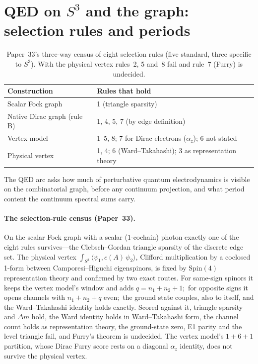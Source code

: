 \documentclass[aps,pra,twocolumn,superscriptaddress,longbibliography]{revtex4-2}
\begin{document}
\section{QED on $S^3$ and the graph: selection rules and periods}\label{sec:qed}

\begin{table}[t]
\centering
\begin{tabular}{ll}
\hline\hline
Construction & Rules that hold \\
\hline
Scalar Fock graph          & 1 (triangle sparsity) \\
Native Dirac graph (rule B) & 1, 4, 5, 7 (by edge definition) \\
Vertex model               & 1--5, 8; 7 for Dirac electrons ($\alpha_z$); 6 not stated \\
Physical vertex            & 1, 4; 6 (Ward--Takahashi); 3 as representation theory \\
\hline\hline
\end{tabular}
\caption{Paper~33's three-way census of eight selection rules (five
standard, three specific to $S^3$).  With the physical vertex rules~2,
5 and~8 fail and rule~7 (Furry) is undecided.}
\label{tab:partition}
\end{table}

The QED arc asks how much of perturbative quantum electrodynamics is
visible on the combinatorial graph, before any continuum projection, and
what period content the continuum spectral sums carry.

\paragraph{The selection-rule census (Paper~33).}
On the scalar Fock graph with a scalar ($1$-cochain) photon exactly one of
the eight rules survives---the Clebsch--Gordan triangle sparsity of the
discrete edge set.  The physical vertex
$\int_{S^3}\langle\psi_1, c(A)\,\psi_2\rangle$, Clifford multiplication
by a coclosed 1-form between Camporesi--Higuchi eigenspinors, is fixed by
$\mathrm{Spin}(4)$ representation theory and confirmed by two exact
routes.  For same-sign spinors it keeps the vertex model's window and
adds $q = n_1 + n_2 + 1$;\ for opposite signs it opens channels with
$n_1 + n_2 + q$ even;\ the ground state couples, also to itself, and the
Ward--Takahashi identity holds exactly.  Scored against it, triangle
sparsity and $\Delta m$ hold, the Ward identity holds in
Ward--Takahashi form, the channel count holds as representation theory,
the ground-state zero, E1 parity and the level triangle fail, and Furry's
theorem is undecided.  The vertex model's $1{+}6{+}1$ partition, whose
Dirac Furry score rests on a diagonal $\alpha_z$ identity, does not
survive the physical vertex.
\end{document}
